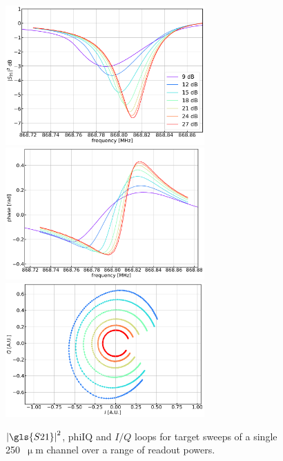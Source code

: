 \begin{figure}[!ptbh]
\centering
\caption[~Sweeps at different tone powers for a single resonator.]{$\left| \gls{S21} \right|^{2}$, \gls{phiIQ} and $I/Q$ loops for target sweeps of a single 250~$\upmu$m channel over a range of readout powers.}
\includegraphics[width=0.68\textwidth]{figures/blast_data/sweeps/mag_tone_power_may}
\includegraphics[width=0.68\textwidth]{figures/blast_data/sweeps/phase_tone_power_may}
\includegraphics[width=0.68\textwidth]{figures/blast_data/sweeps/IQ_tone_power_may}
\label{fig:may out atten}
\end{figure}

